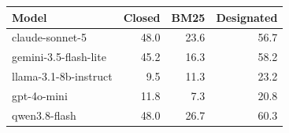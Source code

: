 \begin{tabular}{lrrr}
\toprule
Model & Closed & BM25 & Designated \\
\midrule
claude-sonnet-5 & 48.0 & 23.6 & 56.7 \\
gemini-3.5-flash-lite & 45.2 & 16.3 & 58.2 \\
llama-3.1-8b-instruct & 9.5 & 11.3 & 23.2 \\
gpt-4o-mini & 11.8 & 7.3 & 20.8 \\
qwen3.8-flash & 48.0 & 26.7 & 60.3 \\
\bottomrule
\end{tabular}
